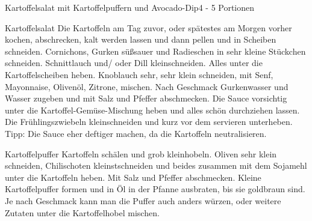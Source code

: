 \documentclass[a4paper,10pt]{article}
\begin{document}
    \begin{recipe}{Kartoffelsalat mit Kartoffelpuffern und Avocado-Dip}{4 - 5 
    Portionen}{}

      \freeform \hfill 
      
      \freeform Kartoffelsalat
      Die Kartoffeln am Tag zuvor, oder spätestes am Morgen vorher kochen, abschrecken, kalt 
      werden lassen und dann pellen und in Scheiben schneiden.
      Cornichons, Gurken süßsauer und Radieschen in sehr kleine Stückchen schneiden. 
      Schnittlauch und/ oder Dill kleinschneiden. Alles unter die Kartoffelscheiben heben.
      Knoblauch sehr, sehr klein schneiden, mit Senf, Mayonnaise, Olivenöl, Zitrone, mischen.
      Nach Geschmack Gurkenwasser und Wasser zugeben und mit Salz und Pfeffer abschmecken. 
      Die Sauce vorsichtig unter die Kartoffel-Gemüse-Mischung heben und alles schön durchziehen lassen.
      Die Frühlingszwiebeln kleinschneiden und kurz vor dem servieren unterheben.
      \freeform Tipp: Die Sauce eher deftiger machen, da die Kartoffeln neutralisieren.
      
      \freeform Kartoffelpuffer
      Kartoffeln schälen und grob kleinhobeln.
      Oliven sehr klein schneiden, Chilischoten kleinstschneiden und beides zusammen mit dem Sojamehl 
      unter die Kartoffeln heben. Mit Salz und Pfeffer abschmecken. Kleine Kartoffelpuffer formen und
      in Öl in der Pfanne ausbraten, bis sie goldbraun sind. 
      \freeform Je nach Geschmack kann man die Puffer auch anders würzen, oder weitere Zutaten unter 
      die Kartoffelhobel mischen. 
      

\end{recipe}
\end{document}
